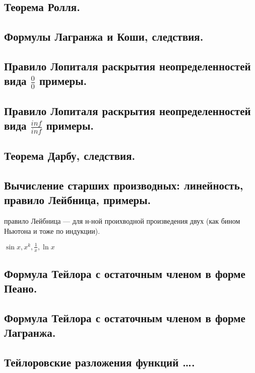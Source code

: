 \documentclass[12pt, a4paper]{article}
\begin{document}
\subsection{Теорема Ролля.}

\subsection{Формулы Лагранжа и Коши, следствия.}

\subsection{Правило Лопиталя раскрытия неопределенностей вида $\frac{0}{0}$ примеры.}

\subsection{Правило Лопиталя раскрытия неопределенностей вида $\frac{inf}{inf}$ примеры.}

\subsection{Теорема Дарбу, следствия.}

\subsection{Вычисление старших производных: линейность, правило Лейбница, примеры.}

правило Лейбница — для н-ной проихводной произведения двух (как бином Ньютона и тоже по индукции).

$\sin x, x^k, \frac{1}{x}, \ln x$

\subsection{Формула Тейлора с остаточным членом в форме Пеано.}

\subsection{Формула Тейлора с остаточным членом в форме Лагранжа.}

\subsection{Тейлоровские разложения функций ….} %
\end{document}
